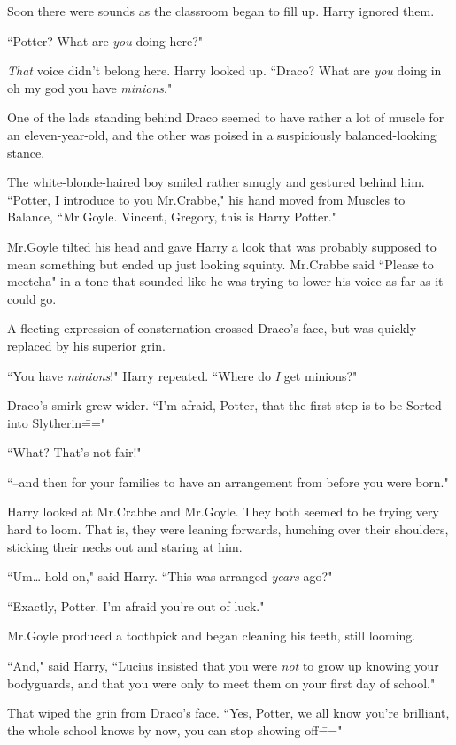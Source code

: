 Soon there were sounds as the classroom began to fill up. Harry ignored them.

``Potter? What are \emph{you} doing here?"

\emph{That} voice didn't belong here. Harry looked up. ``Draco? What are \emph{you} doing in oh my god you have \emph{minions}."

One of the lads standing behind Draco seemed to have rather a lot of muscle for an eleven-year-old, and the other was poised in a suspiciously balanced-looking stance.

The white-blonde-haired boy smiled rather smugly and gestured behind him. ``Potter, I introduce to you Mr.\?Crabbe," his hand moved from Muscles to Balance, ``Mr.\?Goyle. Vincent, Gregory, this is Harry Potter."

Mr.\?Goyle tilted his head and gave Harry a look that was probably supposed to mean something but ended up just looking squinty. Mr.\?Crabbe said ``Please to meetcha" in a tone that sounded like he was trying to lower his voice as far as it could go.

A fleeting expression of consternation crossed Draco's face, but was quickly replaced by his superior grin.

``You have \emph{minions}!" Harry repeated. ``Where do \emph{I} get minions?"

Draco's smirk grew wider. ``I'm afraid, Potter, that the first step is to be Sorted into Slytherin\==="

``What? That's not fair!"

``\---and then for your families to have an arrangement from before you were born."

Harry looked at Mr.\?Crabbe and Mr.\?Goyle. They both seemed to be trying very hard to loom. That is, they were leaning forwards, hunching over their shoulders, sticking their necks out and staring at him.

``Um{\ldots} hold on," said Harry. ``This was arranged \emph{years} ago?"

``Exactly, Potter. I'm afraid you're out of luck."

Mr.\?Goyle produced a toothpick and began cleaning his teeth, still looming.

``And," said Harry, ``Lucius insisted that you were \emph{not} to grow up knowing your bodyguards, and that you were only to meet them on your first day of school."

That wiped the grin from Draco's face. ``Yes, Potter, we all know you're brilliant, the whole school knows by now, you can stop showing off\==="


